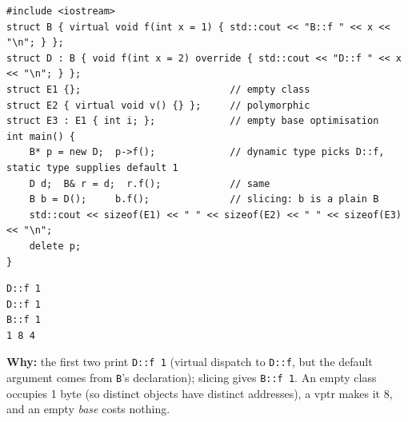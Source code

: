 \documentclass[10pt,a4paper,openany,oneside]{report}
\begin{document}
\begin{lstlisting}[language={[11]C++},title={Static default args, slicing, empty-base optimisation, vptr size}]
#include <iostream>
struct B { virtual void f(int x = 1) { std::cout << "B::f " << x << "\n"; } };
struct D : B { void f(int x = 2) override { std::cout << "D::f " << x << "\n"; } };
struct E1 {};                          // empty class
struct E2 { virtual void v() {} };     // polymorphic
struct E3 : E1 { int i; };             // empty base optimisation
int main() {
    B* p = new D;  p->f();             // dynamic type picks D::f, static type supplies default 1
    D d;  B& r = d;  r.f();            // same
    B b = D();     b.f();              // slicing: b is a plain B
    std::cout << sizeof(E1) << " " << sizeof(E2) << " " << sizeof(E3) << "\n";
    delete p;
}
\end{lstlisting}
\begin{lstlisting}[style=out,title={Answer: captured output}]
D::f 1
D::f 1
B::f 1
1 8 4
\end{lstlisting}
\textbf{Why:} the first two print \texttt{D::f 1} (virtual dispatch to \texttt{D::f}, but the default argument comes from \texttt{B}'s declaration); slicing gives \texttt{B::f 1}. An empty class occupies 1 byte (so distinct objects have distinct addresses), a vptr makes it 8, and an empty \emph{base} costs nothing.
\end{document}
